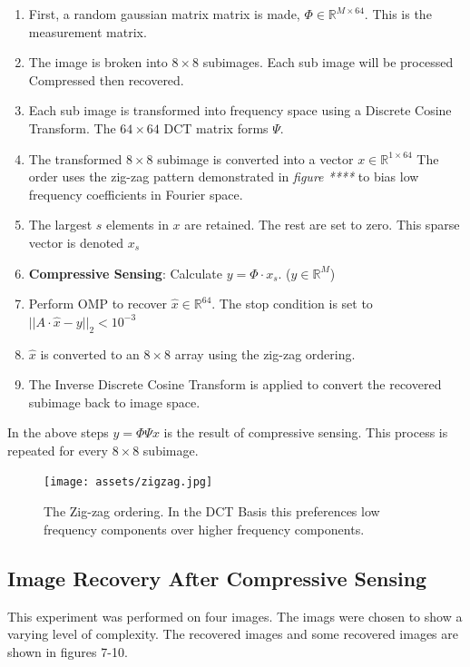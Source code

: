 \documentclass{article}
\begin{document}
\begin{enumerate}
    \item First, a random gaussian matrix matrix is made, $\Phi \in \mathbb{R}^{M \times 64}$.
        This is the measurement matrix.
    \item The image is broken into $8 \times 8$ subimages.
        Each sub image will be processed Compressed then recovered.
    \item Each sub image is transformed into frequency space using a Discrete Cosine Transform.
        The $64 \times 64$ DCT matrix forms $\Psi$.
    \item The transformed $8 \times 8$ subimage is converted into a vector $x \in \mathbb{R}^{1 \times 64}$
        The order uses the zig-zag pattern demonstrated in {\it figure ****} to bias low frequency coefficients in Fourier space.
    \item The largest $s$ elements in $x$ are retained. The rest are set to zero. This sparse vector is denoted $x_s$
    \item {\bf Compressive Sensing}: Calculate $y = \Phi \cdot x_s$. ($y \in \mathbb{R}^M$)
    \item Perform OMP to recover $\hat{x} \in \mathbb{R}^{64}$.
        The stop condition is set to $||A\cdot \hat{x} - y||_2 < 10^{-3}$
    \item $\hat{x}$ is converted to an $8 \times 8$ array using the zig-zag ordering.
    \item The Inverse Discrete Cosine Transform is applied to convert the recovered subimage back to image space.
\end{enumerate}

In the above steps $y = \Phi \Psi x$ is the result of compressive sensing.
This process is repeated for every $8 \times 8$ subimage.

\begin{figure}[h]
    \captionsetup{width=.5\linewidth}
    \centering
        \texttt{[image: assets/zigzag.jpg]}
        \caption{The Zig-zag ordering. In the DCT Basis this preferences low frequency components over higher frequency components.}
\end{figure}


\newpage
\subsection*{Image Recovery After Compressive Sensing}

This experiment was performed on four images.
The imags were chosen to show a varying level of complexity.
The recovered images and some recovered images are shown in figures 7-10.
\end{document}
